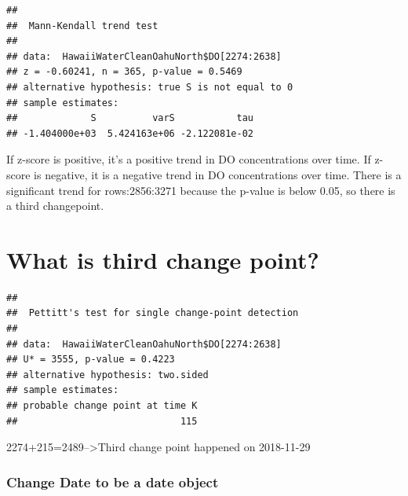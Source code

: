 \documentclass[12pt,]{article}
\newenvironment{Shaded}{\begin{snugshade}}{\end{snugshade}}
\newcommand{\KeywordTok}[1]{\textcolor[rgb]{0.13,0.29,0.53}{\textbf{#1}}}
\newcommand{\DataTypeTok}[1]{\textcolor[rgb]{0.13,0.29,0.53}{#1}}
\newcommand{\DecValTok}[1]{\textcolor[rgb]{0.00,0.00,0.81}{#1}}
\newcommand{\StringTok}[1]{\textcolor[rgb]{0.31,0.60,0.02}{#1}}
\newcommand{\OperatorTok}[1]{\textcolor[rgb]{0.81,0.36,0.00}{\textbf{#1}}}
\newcommand{\NormalTok}[1]{#1}
\begin{document}
\begin{verbatim}
## 
##  Mann-Kendall trend test
## 
## data:  HawaiiWaterCleanOahuNorth$DO[2274:2638]
## z = -0.60241, n = 365, p-value = 0.5469
## alternative hypothesis: true S is not equal to 0
## sample estimates:
##             S          varS           tau 
## -1.404000e+03  5.424163e+06 -2.122081e-02
\end{verbatim}

If z-score is positive, it's a positive trend in DO concentrations over
time. If z-score is negative, it is a negative trend in DO
concentrations over time. There is a significant trend for
rows:2856:3271 because the p-value is below 0.05, so there is a third
changepoint.

\section{What is third change point?}\label{what-is-third-change-point}

\begin{Shaded}
\end{Shaded}

\begin{verbatim}
## 
##  Pettitt's test for single change-point detection
## 
## data:  HawaiiWaterCleanOahuNorth$DO[2274:2638]
## U* = 3555, p-value = 0.4223
## alternative hypothesis: two.sided
## sample estimates:
## probable change point at time K 
##                             115
\end{verbatim}

2274+215=2489--\textgreater{}Third change point happened on 2018-11-29

\subsubsection{Change Date to be a date
object}\label{change-date-to-be-a-date-object}

\begin{Shaded}
\end{Shaded}
\end{document}
